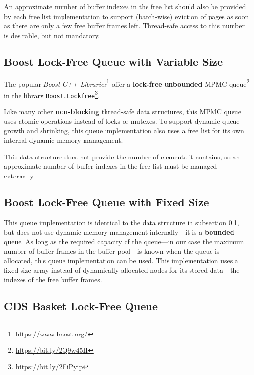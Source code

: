     An approximate number of buffer indexes in the free list should also be provided by each free list implementation to support (batch-wise) eviction of pages as soon as there are only a few free buffer frames left. Thread-safe access to this number is desirable, but not mandatory.

\subsection[Boost Lock-Free Queue with Variable Size]{Boost Lock-Free Queue with Variable Size} \label{subsec:boost}

	The popular \textit{Boost C++ Libraries}\footnote{\url{https://www.boost.org/}} offer a \textbf{lock-free} \textbf{unbounded} MPMC queue\footnote{\url{https://bit.ly/2Q9w45H}} in the library \texttt{Boost.Lockfree}\footnote{\url{https://bit.ly/2FiPyip}}.

    Like many other \textbf{non-blocking} thread-safe data structures, this MPMC queue uses atomic operations instead of locks or mutexes. To support dynamic queue growth and shrinking, this queue implementation also uses a free list for its own internal dynamic memory management.
	
    This data structure does not provide the number of elements it contains, so an approximate number of buffer indexes in the free list must be managed externally.

\subsection[Boost Lock-Free Queue with Fixed Size]{Boost Lock-Free Queue with Fixed Size} \label{subsec:boost-fixed}

	This queue implementation is identical to the data structure in subsection \ref{subsec:boost}, but does not use dynamic memory management internally---it is a \textbf{bounded} queue. As long as the required capacity of the queue---in our case the maximum number of buffer frames in the buffer pool---is known when the queue is allocated, this queue implementation can be used. This implementation uses a fixed size array instead of dynamically allocated nodes for its stored data---the indexes of the free buffer frames.

\subsection[CDS BasketQueue]{CDS Basket Lock-Free Queue} \label{subsec:cds-basket}


